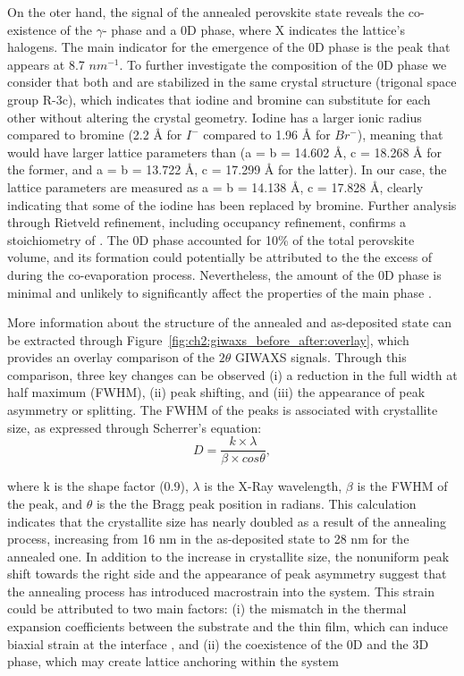 On the oter hand, the signal of the annealed perovskite state reveals the co-existence of the $\gamma$- phase and a 0D  phase, where X indicates the lattice's halogens. The main indicator for the emergence of the 0D phase is the peak that appears at 8.7 $nm^{-1}$. To further investigate the composition of the 0D phase we consider that both  and  are stabilized in the same crystal structure (trigonal space group R-3c), which indicates that iodine and bromine can substitute for each other without altering the crystal geometry. Iodine has a larger ionic radius compared to bromine (2.2 {\AA} for $I^-$ compared to 1.96 {\AA} for $Br^-$), meaning that  would have larger lattice parameters than  (a = b = 14.602 {\AA}, c = 18.268 {\AA} for the former, and a = b = 13.722 {\AA}, c = 17.299 {\AA} for the latter)\cite{Bhaumik2020BroadbandNanocrystals,DeBastiani2017InsideCrystals}. In our case, the lattice parameters are measured as a = b = 14.138 {\AA}, c = 17.828 {\AA}, clearly indicating that some of the iodine has been replaced by bromine.  Further analysis through Rietveld refinement, including occupancy refinement, confirms a stoichiometry of . The 0D phase accounted for 10\% of the total perovskite volume, and its formation could potentially be attributed to the the excess of  during the co-evaporation process. Nevertheless, the amount of the 0D phase is minimal and unlikely to significantly affect the properties of the main phase \cite{Bai2019AStability}. 

More information about the structure of the annealed and as-deposited state can be extracted through Figure~\ref{fig:ch2:giwaxs_before_after:overlay}, which provides an overlay comparison of the $2\theta$ GIWAXS signals. Through this comparison, three key changes can be observed (i) a reduction in the full width at half maximum (FWHM), (ii) peak shifting, and (iii) the appearance of peak asymmetry or splitting. The FWHM of the peaks is associated with crystallite size, as expressed through Scherrer's equation: 
 \begin{equation}
     D = \frac{k \times \lambda}{\beta \times cos\theta},
 \end{equation}

where k is the shape factor (0.9), $\lambda$ is the X-Ray wavelength, $\beta$ is the FWHM of the peak, and $\theta$ is the the Bragg peak position in radians. This calculation indicates that the crystallite size has nearly doubled as a result of the annealing process, increasing from 16 nm in the as-deposited state to 28 nm for the annealed one. In addition to the increase in crystallite size, the nonuniform peak shift towards the right side and the appearance of peak asymmetry suggest that the annealing process has introduced macrostrain into the system. This strain could be attributed to two main factors: (i) the mismatch in the thermal expansion coefficients between the substrate and the thin film, which can induce biaxial strain at the interface \cite{Steele2019ThermalFilms}, and (ii) the coexistence of the 0D  and the 3D  phase, which may create lattice anchoring within the system \cite{Steele2022AnFilms, Saha2024Oxygen-MediatedPerformance}

